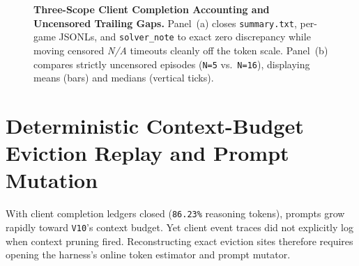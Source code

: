 \documentclass[10pt]{article}
\newcommand{\code}[1]{\texttt{#1}}
\newcommand{\na}{\textit{N/A}}
\begin{document}
\begin{figure}[t]
{%
}
\caption{\textbf{Three-Scope Client Completion Accounting and Uncensored Trailing Gaps.} Panel~(a) closes \code{summary.txt}, per-game JSONLs, and \code{solver\_note} to exact zero discrepancy while moving censored \na{} timeouts cleanly off the token scale. Panel~(b) compares strictly uncensored episodes (\code{N=5} vs.\ \code{N=16}), displaying means (bars) and medians (vertical ticks).}
\label{fig:tokens}
\end{figure}

\section{Deterministic Context-Budget Eviction Replay and Prompt Mutation}
\label{sec:replay}

With client completion ledgers closed (\code{86.23\%} reasoning tokens), prompts grow rapidly toward \code{V10}'s context budget. Yet client event traces did not explicitly log when context pruning fired. Reconstructing exact eviction sites therefore requires opening the harness's online token estimator and prompt mutator.
\end{document}
